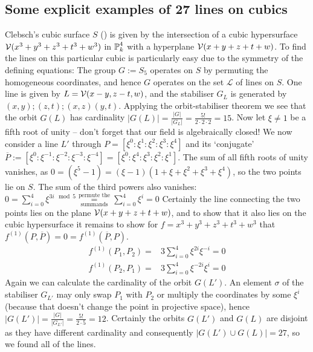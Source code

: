 \subsection{Some explicit examples of 27 lines on cubics}


\begin{example}
Clebsch's cubic surface $S$ (\cite[§16,p.331 ff.]{clebsch1871ueber}) is given by the intersection of a cubic hypersurface $\operatorname{\mathcal V}(x^3 + y^3 + z^3 + t^3 + w^3)$ in $\operatorname{\mathbb P}^4_k$ with a hyperplane $\operatorname{\mathcal V}(x+y+z+t+w)$.
To find the lines on this particular cubic is particularly easy due to the symmetry of the defining equations: The group $G := S_5$ operates on $S$ by permuting the homogeneous coordinates, and hence $G$ operates on the set $\mathcal L$ of lines on $S$.
One line is given by $L = \operatorname{\mathcal V}(x-y,z-t,w)$, and the stabiliser $G_L$ is generated by $(x,y);(z,t);(x,z)(y,t)$.
Applying the orbit-stabiliser theorem we see that the orbit $G(L)$ has cardinality $|G(L)| = \frac{|G|}{|G_L|} = \frac{5!}{2\cdot2\cdot2} = 15$.
Now let $\xi \neq 1$ be a fifth root of unity -- don't forget that our field is algebraically closed!
We now consider a line $L'$ through $P = [\xi^0:\xi^1:\xi^2:\xi^3:\xi^4]$ and its `conjugate' $\overline{P} := [\xi^0:\xi^{-1}:\xi^{-2}:\xi^{-3}:\xi^{-4}] = [\xi^0:\xi^4:\xi^3:\xi^2:\xi^1]$.
The sum of all fifth roots of unity vanishes, as $0 = (\xi^5 - 1) = (\xi - 1)(1 + \xi + \xi^2+\xi^3+\xi^4)$, so the two points lie on $S$.
The sum of the third powers also vanishes: $0 = \sum_{i=0}^4 \xi^{3i \mod 5} \overset{\text{permute the}}{\underset{\text{summands}}=} \sum_{i=0}^4 \xi^i = 0$
Certainly the line connecting the two points lies on the plane $\operatorname{\mathcal V}(x+y+z+t+w)$, and to show that it also lies on the cubic hypersurface it remains to show for $f = x^3 + y^3 + z^3 + t^3 + w^3$ that $f^{(1)}(P,\overline P) = 0 = f^{(1)}(\overline P,P)$.
\begin{align}
f^{(1)}(P_1,P_2) =& 3 \sum_{i=0}^4 \xi^{2i}\xi^{-i} = 0 \\
f^{(1)}(P_2,P_1) =& 3 \sum_{i=0}^4 \xi^{-2i}\xi^{i} = 0
\end{align}
Again we can calculate the cardinality of the orbit $G(L')$.
An element $\sigma$ of the stabiliser $G_{L'}$ may only swap $P_1$ with $P_2$ or multiply the coordinates by some $\xi^i$ (because that doesn't change the point in projective space), hence $|G(L')| = \frac{|G|}{|G_{L'}|} = \frac{5!}{2\cdot 5} = 12$.
Certainly the orbits $G(L')$ and $G(L)$ are disjoint as they have different cardinality and consequently $|G(L') \cup G(L)| = 27$, so we found all of the lines.
\end{example}



